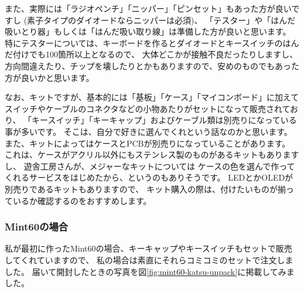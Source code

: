\documentclass[mingoth,a4paper]{jsarticle}
\begin{document}
また、実際には「ラジオペンチ」「ニッパー」「ピンセット」もあった方が良いですし
(素子タイプのダイオードならニッパーは必須)、
「テスター」や「はんだ吸いとり器」もしくは「はんだ吸い取り線」は準備した方が良いと思います。
特にテスターについては、キーボードを作るとダイオードとキースイッチのはんだ付けでも100箇所以上となるので、
大体どこかが接触不良だったりしますし、
方向間違えたり、チップを壊したりとかもありますので、安めのものでもあった方が良いかと思います。

なお、キットですが、基本的には「基板」「ケース」「マイコンボード」に加えて
スイッチやケーブルのコネクタなどの小物あたりがセットになって販売されており、
「キースイッチ」「キーキャップ」およびケーブル類は別売りになっている事が多いです。
そこは、自分で好きに選んでくれという話なのかと思います。
また、キットによってはケースとPCBが別売りになっていることがあります。
これは、ケースがアクリル以外にもステンレス製のものがあるキットもありますし、
遊舎工房さんが、メジャーなキットについては
ケースの色を選んで作ってくれるサービスをはじめたから、というのもありそうです。
LEDとかOLEDが別売りであるキットもありますので、
キット購入の際は、付けたいものが揃っているか確認するのをおすすめします。

\subsubsection*{Mint60の場合}

私が最初に作ったMint60の場合、キーキャップやキースイッチもセットで販売してくれていますので、
私の場合は素直にそれらコミコミのセットで注文しました。
届いて開封したときの写真を図\ref{fig:mint60-katsu-unpack}に掲載してみました。
\end{document}
